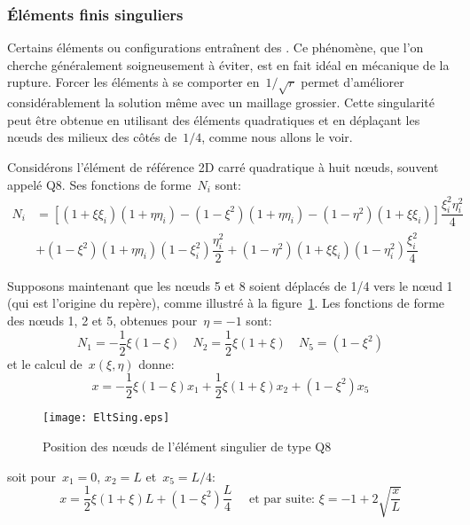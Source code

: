 \medskip
\subsubsection{Éléments finis singuliers}

Certains éléments ou configurations entraînent des . Ce phénomène, que l'on cherche généralement soigneusement à éviter, est en fait idéal en mécanique de la rupture. Forcer les éléments à se comporter en~$1/\sqrt{r}$ permet d'améliorer considérablement la solution même avec un maillage grossier. Cette singularité peut être obtenue en utilisant des éléments quadratiques et en déplaçant les nœuds des milieux des côtés de~$1/4$, comme nous allons le voir.

\medskip
Considérons l'élément de référence 2D carré quadratique à huit nœuds, souvent appelé Q8. Ses fonctions de forme~$N_i$ sont:
\begin{equation} \begin{aligned}
N_i &=\left[ (1+\xi\xi_i)(1+\eta\eta_i)-(1-\xi^2)(1+\eta\eta_i)-(1-\eta^2)(1+\xi\xi_i)\right]
\dfrac{\xi_i^2\eta_i^2}4 \\
& +
(1-\xi^2)(1+\eta\eta_i)(1-\xi_i^2)\dfrac{\eta_i^2}2 +
(1-\eta^2)(1+\xi\xi_i)(1-\eta_i^2)\dfrac{\xi_i^2}4
\end{aligned}\end{equation}

Supposons maintenant que les nœuds 5 et 8 soient déplacés de 1/4 vers le nœud 1 (qui est l'origine du repère), comme illustré à la figure~\ref{fig-EltSing}. Les fonctions de forme des nœuds 1, 2 et 5, obtenues pour~$\eta=-1$ sont:
\begin{equation} N_1= -\frac12\xi(1-\xi) \quad
 N_2 = \frac12\xi(1+\xi) \quad
 N_5 = (1-\xi^2)
\end{equation}
et le calcul de~$x(\xi,\eta)$ donne:
\begin{equation} x = -\frac12\xi(1-\xi)x_1 + \frac12\xi(1+\xi)x_2 + (1-\xi^2)x_5 \end{equation}
\begin{figure}[ht]\centering
\texttt{[image: EltSing.eps]}
\caption{Position des nœuds de l'élément singulier de type Q8}\label{fig-EltSing}
\end{figure}
soit pour~$x_1=0$, $x_2=L$ et~$x_5=L/4$:
\begin{equation} x = \frac12\xi(1+\xi)L + (1-\xi^2)\frac{L}4 \quad \text{ et par suite: }
\xi=-1+2\sqrt{\frac{x}L} \end{equation}


